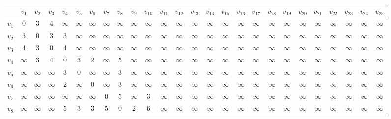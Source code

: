 \begin{tabular}{c|ccccccccccccccccccccccccc}
 & $v_{1}$ & $v_{2}$ & $v_{3}$ & $v_{4}$ & $v_{5}$ & $v_{6}$ & $v_{7}$ & $v_{8}$ & $v_{9}$ & $v_{10}$ & $v_{11}$ & $v_{12}$ & $v_{13}$ & $v_{14}$ & $v_{15}$ & $v_{16}$ & $v_{17}$ & $v_{18}$ & $v_{19}$ & $v_{20}$ & $v_{21}$ & $v_{22}$ & $v_{23}$ & $v_{24}$ & $v_{25}$ \\ \hline
$v_{1}$ & 0 & 3 & 4 & $\infty$ & $\infty$ & $\infty$ & $\infty$ & $\infty$ & $\infty$ & $\infty$ & $\infty$ & $\infty$ & $\infty$ & $\infty$ & $\infty$ & $\infty$ & $\infty$ & $\infty$ & $\infty$ & $\infty$ & $\infty$ & $\infty$ & $\infty$ & $\infty$ & $\infty$ \\
$v_{2}$ & 3 & 0 & 3 & 3 & $\infty$ & $\infty$ & $\infty$ & $\infty$ & $\infty$ & $\infty$ & $\infty$ & $\infty$ & $\infty$ & $\infty$ & $\infty$ & $\infty$ & $\infty$ & $\infty$ & $\infty$ & $\infty$ & $\infty$ & $\infty$ & $\infty$ & $\infty$ & $\infty$ \\
$v_{3}$ & 4 & 3 & 0 & 4 & $\infty$ & $\infty$ & $\infty$ & $\infty$ & $\infty$ & $\infty$ & $\infty$ & $\infty$ & $\infty$ & $\infty$ & $\infty$ & $\infty$ & $\infty$ & $\infty$ & $\infty$ & $\infty$ & $\infty$ & $\infty$ & $\infty$ & $\infty$ & $\infty$ \\
$v_{4}$ & $\infty$ & 3 & 4 & 0 & 3 & 2 & $\infty$ & 5 & $\infty$ & $\infty$ & $\infty$ & $\infty$ & $\infty$ & $\infty$ & $\infty$ & $\infty$ & $\infty$ & $\infty$ & $\infty$ & $\infty$ & $\infty$ & $\infty$ & $\infty$ & $\infty$ & $\infty$ \\
$v_{5}$ & $\infty$ & $\infty$ & $\infty$ & 3 & 0 & $\infty$ & $\infty$ & 3 & $\infty$ & $\infty$ & $\infty$ & $\infty$ & $\infty$ & $\infty$ & $\infty$ & $\infty$ & $\infty$ & $\infty$ & $\infty$ & $\infty$ & $\infty$ & $\infty$ & $\infty$ & $\infty$ & $\infty$ \\
$v_{6}$ & $\infty$ & $\infty$ & $\infty$ & 2 & $\infty$ & 0 & $\infty$ & 3 & $\infty$ & $\infty$ & $\infty$ & $\infty$ & $\infty$ & $\infty$ & $\infty$ & $\infty$ & $\infty$ & $\infty$ & $\infty$ & $\infty$ & $\infty$ & $\infty$ & $\infty$ & $\infty$ & $\infty$ \\
$v_{7}$ & $\infty$ & $\infty$ & $\infty$ & $\infty$ & $\infty$ & $\infty$ & 0 & 5 & $\infty$ & 3 & $\infty$ & $\infty$ & $\infty$ & $\infty$ & $\infty$ & $\infty$ & $\infty$ & $\infty$ & $\infty$ & $\infty$ & $\infty$ & $\infty$ & $\infty$ & $\infty$ & $\infty$ \\
$v_{8}$ & $\infty$ & $\infty$ & $\infty$ & 5 & 3 & 3 & 5 & 0 & 2 & 6 & $\infty$ & $\infty$ & $\infty$ & $\infty$ & $\infty$ & $\infty$ & $\infty$ & $\infty$ & $\infty$ & $\infty$ & $\infty$ & $\infty$ & $\infty$ & $\infty$ & $\infty$ \\

\end{tabular}
